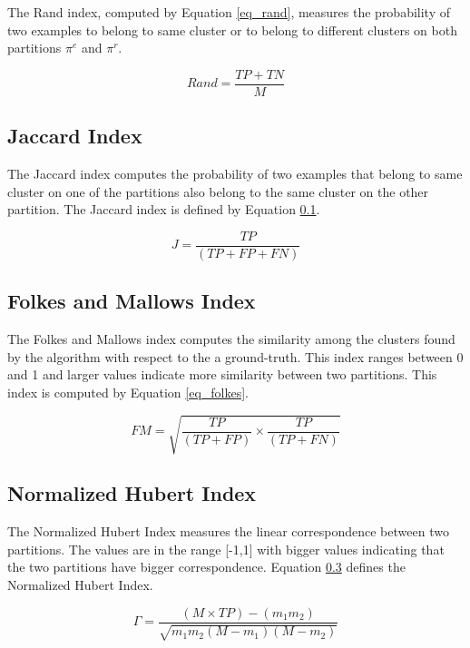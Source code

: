 The Rand index, computed by Equation \ref{eq_rand}, measures the probability of two examples to belong to same cluster or to belong to different clusters on both partitions $\pi^e$ and $\pi^r$.

\begin{equation}
\label{eq_rand}
    Rand=\frac{TP+TN}{M}
\end{equation}


\subsection{Jaccard Index}
\label{eq_jaccard}

The Jaccard index computes the probability of two examples that belong to same cluster on one of the partitions also belong to the same cluster on the other partition. The Jaccard index is defined by Equation \ref{eq_jaccard}.

\begin{equation}
    J=\frac{TP}{(TP+FP+FN)}
\end{equation}
    
\subsection{Folkes and Mallows Index}
\label{sec_folkes}

The Folkes and Mallows index computes the similarity among the clusters found by the algorithm with respect to the a ground-truth. This index ranges between 0 and 1 and larger values indicate more similarity between two partitions. This index is computed by Equation \ref{eq_folkes}. 

\begin{equation}
\label{eq_folkes}
    FM=\sqrt{\frac{TP}{(TP+FP)}\times\frac{TP}{(TP+FN)}}
\end{equation}


\subsection{Normalized Hubert Index}
\label{eq_hubert}

The Normalized Hubert Index measures the linear correspondence between two partitions. The values are in the range [-1,1] with bigger values indicating that the two partitions have bigger correspondence. Equation \ref{eq_hubert} defines the Normalized Hubert Index.

\begin{equation}
    \Gamma=\frac{(M\times TP)-(m_1m_2)}{\sqrt{m_1m_2(M-m_1)(M-m_2)}}
\end{equation}



